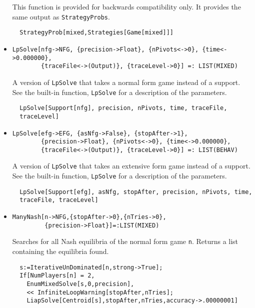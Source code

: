 \begin{itemize}
\bd 
This function is provided for backwards compatibility only.  It
provides the same output as \verb+StrategyProbs+.
\begin{verbatim}
  StrategyProb[mixed,Strategies[Game[mixed]]]
\end{verbatim} 
\ed

\item{}
\protect \large \begin{verbatim}
LpSolve[nfg->NFG, {precision->Float}, {nPivots<->0}, {time<->0.000000}, 
        {traceFile<->(Output)}, {traceLevel->0}] =: LIST(MIXED) 
\end{verbatim}\normalsize

\bd 
A version of \verb+LpSolve+ that takes a normal form
game instead of a support.  See the built-in function,
\verb+LpSolve+ for a description of the parameters.
\begin{verbatim}
  LpSolve[Support[nfg], precision, nPivots, time, traceFile, 
  traceLevel]
\end{verbatim} 
\ed

\item{}
\protect \large \begin{verbatim}
LpSolve[efg->EFG, {asNfg->False}, {stopAfter->1},
        {precision->Float}, {nPivots<->0}, {time<->0.000000}, 
        {traceFile<->(Output)}, {traceLevel->0}] =: LIST(BEHAV) 
\end{verbatim}\normalsize

\bd 
A version of \verb+LpSolve+ that takes an extensive form
game instead of a support.  See the built-in function,
\verb+LpSolve+ for a description of the parameters.
\begin{verbatim}
  LpSolve[Support[efg], asNfg, stopAfter, precision, nPivots, time, 
  traceFile, traceLevel]
\end{verbatim} 
\ed


\item{}
\protect \large \begin{verbatim}
ManyNash[n->NFG,{stopAfter->0},{nTries->0},
         {precision->Float}]=:LIST(MIXED)
\end{verbatim}\normalsize

\bd 
Searches for all Nash equilibria of the normal form game
\verb+n+.  Returns a list containing the equilibria found.

\begin{verbatim}
  s:=IterativeUnDominated[n,strong->True];
  If[NumPlayers[n] = 2, 
    EnumMixedSolve[s,0,precision],
    << InfiniteLoopWarning[stopAfter,nTries];
    LiapSolve[Centroid[s],stopAfter,nTries,accuracy->.00000001]
\end{verbatim} 
\ed


\end{itemize}
